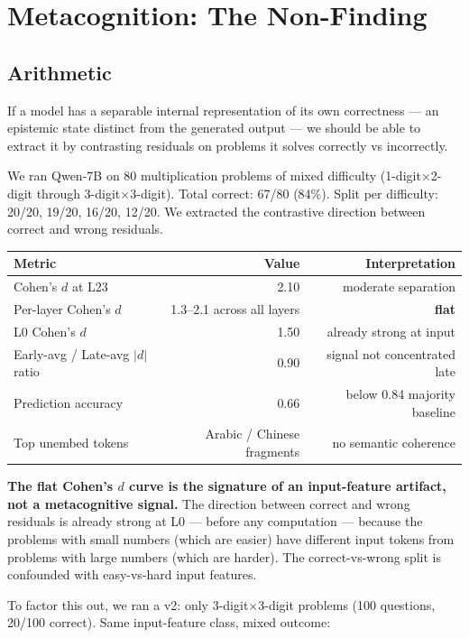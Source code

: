 \documentclass[11pt,a4paper]{article}
\begin{document}
\section{Metacognition: The Non-Finding}

\subsection{Arithmetic}

If a model has a separable internal representation of its own correctness --- an epistemic state distinct from the generated output --- we should be able to extract it by contrasting residuals on problems it solves correctly vs incorrectly.

We ran Qwen-7B on 80 multiplication problems of mixed difficulty (1-digit$\times$2-digit through 3-digit$\times$3-digit). Total correct: 67/80 (84\%). Split per difficulty: 20/20, 19/20, 16/20, 12/20. We extracted the contrastive direction between correct and wrong residuals.

\begin{center}
\begin{tabular}{lrr}
\toprule
Metric & Value & Interpretation \\
\midrule
Cohen's $d$ at L23 & 2.10 & moderate separation \\
Per-layer Cohen's $d$ & 1.3--2.1 across all layers & \textbf{flat} \\
L0 Cohen's $d$ & 1.50 & already strong at input \\
Early-avg / Late-avg $|d|$ ratio & 0.90 & signal not concentrated late \\
Prediction accuracy & 0.66 & below 0.84 majority baseline \\
Top unembed tokens & Arabic / Chinese fragments & no semantic coherence \\
\bottomrule
\end{tabular}
\end{center}

\textbf{The flat Cohen's $d$ curve is the signature of an input-feature artifact, not a metacognitive signal.} The direction between correct and wrong residuals is already strong at L0 --- before any computation --- because the problems with small numbers (which are easier) have different input tokens from problems with large numbers (which are harder). The correct-vs-wrong split is confounded with easy-vs-hard input features.

To factor this out, we ran a v2: only 3-digit$\times$3-digit problems (100 questions, 20/100 correct). Same input-feature class, mixed outcome:
\end{document}
